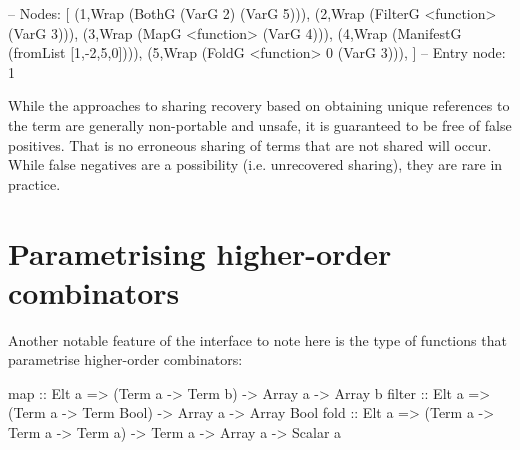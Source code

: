 \documentclass[preamble.tex]{subfiles}
\begin{document}
\begin{hscode}
-- Nodes:
[
  (1,Wrap (BothG (VarG 2) (VarG 5))),
  (2,Wrap (FilterG <function> (VarG 3))),
  (3,Wrap (MapG <function> (VarG 4))),
  (4,Wrap (ManifestG (fromList [1,-2,5,0]))),
  (5,Wrap (FoldG <function> 0 (VarG 3))),
]
-- Entry node:
1
\end{hscode}


While the approaches to sharing recovery based on obtaining unique references to the term are generally non-portable and unsafe, it is guaranteed to be free of false positives. That is no erroneous sharing of terms that are not shared will occur. While false negatives are a possibility (i.e. unrecovered sharing), they are rare in practice.



\section{Parametrising higher-order combinators}
\label{sec:Scalar-language}
\iscalarlang

Another notable feature of the interface to note here is the type of functions that parametrise higher-order combinators:

\begin{hscode}
map    :: Elt a => (Term a -> Term b) -> Array a -> Array b
filter :: Elt a => (Term a -> Term Bool) -> Array a -> Array Bool
fold   :: Elt a => (Term a -> Term a -> Term a) -> Term a -> Array a
                                                          -> Scalar a
\end{hscode}
\end{document}
